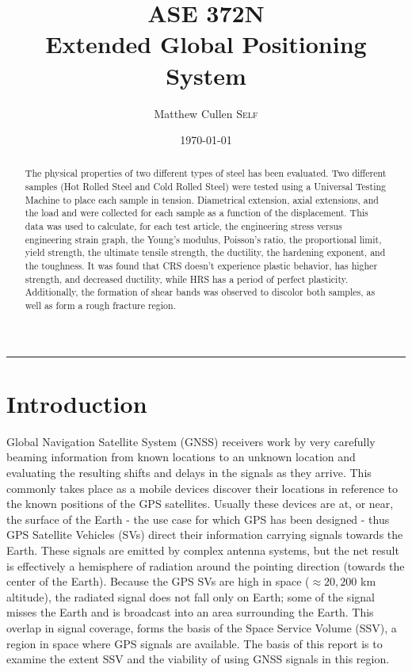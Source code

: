 \documentclass[11pt]{article}
\title{ASE 372N \\ \huge \bfseries Extended Global Positioning System}
\author{\Large Matthew Cullen \textsc{Self}}
\date{\today}
\begin{document}
\maketitle
\hrule
\begin{abstract}
The physical properties of two different types of steel has been evaluated. Two different samples (Hot Rolled Steel and Cold Rolled Steel) were tested using a Universal Testing Machine to place each sample in tension. Diametrical extension, axial extensions, and the load and were collected for each sample as a function of the displacement. This data was used to calculate, for each test article, the engineering stress versus engineering strain graph, the Young's modulus, Poisson's ratio, the proportional limit, yield strength, the ultimate tensile strength, the ductility, the hardening exponent, and the toughness. It was found that CRS doesn't experience plastic behavior, has higher strength, and decreased ductility, while HRS has a period of perfect plasticity. Additionally, the formation of shear bands was observed to discolor both samples, as well as form a rough fracture region.
\end{abstract}


\section{Introduction}
Global Navigation Satellite System (GNSS) receivers work by very carefully beaming information from known locations to an unknown location and evaluating the resulting shifts and delays in the signals as they arrive. This commonly takes place as a mobile devices discover their locations in reference to the known positions of the GPS satellites. Usually these devices are at, or near, the surface of the Earth - the use case for which GPS has been designed - thus GPS Satellite Vehicles (SVs) direct their information carrying signals towards the Earth. These signals are emitted by complex antenna systems, but the net result is effectively a hemisphere of radiation around the pointing direction (towards the center of the Earth). Because the GPS SVs are high in space ($\approx 20,200$ km altitude), the radiated signal does not fall only on Earth; some of the signal misses the Earth and is broadcast into an area surrounding the Earth. This overlap in signal coverage, forms the basis of the Space Service Volume (SSV), a region in space where GPS signals are available. The basis of this report is to examine the extent SSV and the viability of using GNSS signals in this region.
\end{document}
